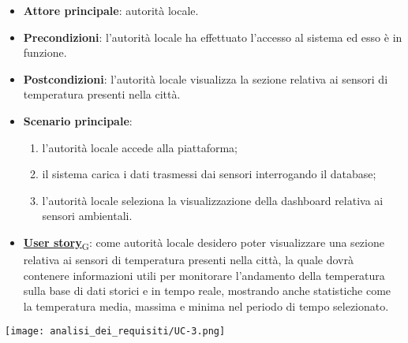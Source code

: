 \begin{itemize}
	\item \textbf{Attore principale}: autorità locale.
	\item \textbf{Precondizioni}: l'autorità locale ha effettuato l'accesso al sistema ed esso è in funzione.
	\item \textbf{Postcondizioni}: l'autorità locale visualizza la sezione relativa
	      ai sensori di temperatura presenti nella città.
	\item \textbf{Scenario principale}:
	      \begin{enumerate}
		      \item l'autorità locale accede alla piattaforma;
		      \item il sistema carica i dati trasmessi dai sensori interrogando il database;
		      \item l'autorità locale seleziona la visualizzazione della dashboard relativa ai sensori ambientali.
	      \end{enumerate}
	\item \href{https://7last.github.io/docs/rtb/documentazione-interna/glossario\#user-story}{\textbf{User story}\textsubscript{G}}:
	      come autorità locale desidero poter visualizzare una sezione relativa ai sensori di temperatura presenti nella città, la quale
	      dovrà contenere informazioni utili per monitorare l'andamento della temperatura sulla base di dati storici e in tempo reale, mostrando
	      anche statistiche come la temperatura media, massima e minima nel periodo di tempo selezionato.
\end{itemize}
\begin{center}
	\texttt{[image: analisi\_dei\_requisiti/UC-3.png]}
\end{center}


